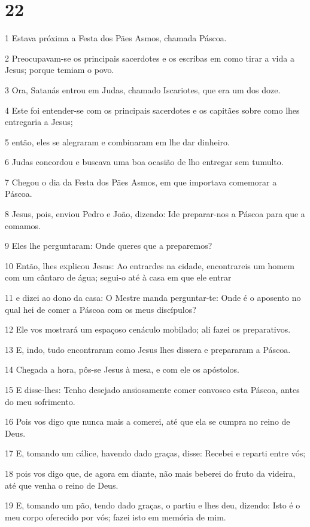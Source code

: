 \chapter{22}

\par 1 Estava próxima a Festa dos Pães Asmos, chamada Páscoa.
\par 2 Preocupavam-se os principais sacerdotes e os escribas em como tirar a vida a Jesus; porque temiam o povo.
\par 3 Ora, Satanás entrou em Judas, chamado Iscariotes, que era um dos doze.
\par 4 Este foi entender-se com os principais sacerdotes e os capitães sobre como lhes entregaria a Jesus;
\par 5 então, eles se alegraram e combinaram em lhe dar dinheiro.
\par 6 Judas concordou e buscava uma boa ocasião de lho entregar sem tumulto.
\par 7 Chegou o dia da Festa dos Pães Asmos, em que importava comemorar a Páscoa.
\par 8 Jesus, pois, enviou Pedro e João, dizendo: Ide preparar-nos a Páscoa para que a comamos.
\par 9 Eles lhe perguntaram: Onde queres que a preparemos?
\par 10 Então, lhes explicou Jesus: Ao entrardes na cidade, encontrareis um homem com um cântaro de água; segui-o até à casa em que ele entrar
\par 11 e dizei ao dono da casa: O Mestre manda perguntar-te: Onde é o aposento no qual hei de comer a Páscoa com os meus discípulos?
\par 12 Ele vos mostrará um espaçoso cenáculo mobilado; ali fazei os preparativos.
\par 13 E, indo, tudo encontraram como Jesus lhes dissera e prepararam a Páscoa.
\par 14 Chegada a hora, pôs-se Jesus à mesa, e com ele os apóstolos.
\par 15 E disse-lhes: Tenho desejado ansiosamente comer convosco esta Páscoa, antes do meu sofrimento.
\par 16 Pois vos digo que nunca mais a comerei, até que ela se cumpra no reino de Deus.
\par 17 E, tomando um cálice, havendo dado graças, disse: Recebei e reparti entre vós;
\par 18 pois vos digo que, de agora em diante, não mais beberei do fruto da videira, até que venha o reino de Deus.
\par 19 E, tomando um pão, tendo dado graças, o partiu e lhes deu, dizendo: Isto é o meu corpo oferecido por vós; fazei isto em memória de mim.
